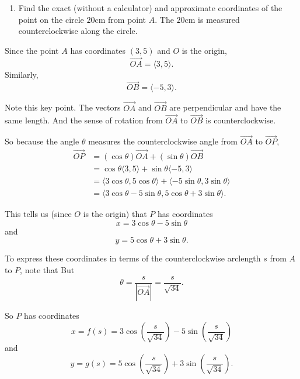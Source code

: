 \documentclass{ximera}
\begin{document}
\begin{question}
\begin{enumerate}
\item Find the exact (without a calculator) and approximate coordinates of the point on the circle $20$cm from point $A$. The $20$cm is measured counterclockwise along the circle.
\end{enumerate}

\begin{explanation}
Since the point $A$ has coordinates $(3,5)$ and $O$ is the origin,
\[
    \overrightarrow{OA} = \langle 3, 5 \rangle.
\]
Similarly,
\[
    \overrightarrow{OB} = \langle -5,3 \rangle.
\]

Note this key point. The vectors $\overrightarrow{OA}$ and $\overrightarrow{OB}$ are perpendicular and have the same length. And the sense of rotation from $\overrightarrow{OA}$ to $\overrightarrow{OB}$ is counterclockwise.

So because the angle $\theta$ measures the counterclockwise angle from $\overrightarrow{OA}$ to $\overrightarrow{OP}$,
\begin{align*}
  \overrightarrow{OP} &= (\cos \theta) \overrightarrow{OA} + (\sin\theta) \overrightarrow{OB} \\
                                 &=\cos\theta \langle 3, 5 \rangle + \sin \theta \langle -5, 3 \rangle \\
                                 &=\langle 3 \cos\theta , 5\cos\theta \rangle + \langle -5\sin \theta, 3 \sin\theta \rangle \\
                                 &= \langle 3 \cos\theta - 5\sin\theta , 5\cos\theta + 3\sin\theta \rangle.
\end{align*}

This tells us (since $O$ is the origin) that $P$ has coordinates
\[
  x = 3 \cos\theta - 5\sin\theta
\]
and
\[ 
    y = 5\cos\theta + 3\sin\theta .
\]

To express these coordinates in terms of the counterclockwise arclength $s$ from $A$ to $P$, note that
But 
\[
  \theta =    \frac{s}{\left|  \overrightarrow{OA} \right|}  = \frac{s}{\sqrt{34}} .
\]

So $P$ has coordinates
\[
      x = f(s) = 3 \cos\left( \frac{s}{\sqrt{34}} \right) - 5\sin\left( \frac{s}{\sqrt{34}} \right)
\]
and
\[
      y = g(s) = 5 \cos\left( \frac{s}{\sqrt{34}} \right) +3\sin\left( \frac{s}{\sqrt{34}} \right) .
\]
 

\end{explanation}

\end{question}
\end{document}
